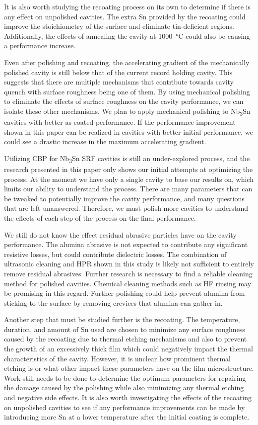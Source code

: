 \documentclass[reprint,amsmath,amssymb,aps]{revtex4-2}%
\begin{document}
It is also worth studying the recoating process on its own to determine if there is any effect on unpolished cavities. The extra Sn provided by the recoating could improve the stoichiometry of the surface and eliminate tin-deficient regions. Additionally, the effects of annealing the cavity at 1000~\unit{\celsius} could also be causing a performance increase.

Even after polishing and recoating, the accelerating gradient of the mechanically polished cavity is still below that of the current record holding cavity\cite{posen2021advances}. This suggests that there are multiple mechanisms that contribute towards cavity quench with surface roughness being one of them. By using mechanical polishing to eliminate the effects of surface roughness on the cavity performance, we can isolate these other mechanisms. We plan to apply mechanical polishing to Nb\textsubscript{3}Sn cavities with better as-coated performance. If the performance improvement shown in this paper can be realized in cavities with better initial performance, we could see a drastic increase in the maximum accelerating gradient.

Utilizing CBP for Nb\textsubscript{3}Sn SRF cavities is still an under-explored process, and the research presented in this paper only shows our initial attempts at optimizing the process. At the moment we have only a single cavity to base our results on, which limits our ability to understand the process. There are many parameters that can be tweaked to potentially improve the cavity performance, and many questions that are left unanswered. Therefore, we must polish more cavities to understand the effects of each step of the process on the final performance.

We still do not know the effect residual abrasive particles have on the cavity performance. The alumina abrasive is not expected to contribute any significant resistive losses, but could contribute dielectric losses. The combination of ultrasonic cleaning and HPR shown in this study is likely not sufficient to entirely remove residual abrasives. Further research is necessary to find a reliable cleaning method for polished cavities. Chemical cleaning methods such as HF rinsing may be promising in this regard. Further polishing could help prevent alumina from sticking to the surface by removing crevices that alumina can gather in.

Another step that must be studied further is the recoating. The temperature, duration, and amount of Sn used are chosen to minimize any surface roughness caused by the recoating due to thermal etching mechanisms and also to prevent the growth of an excessively thick film which could negatively impact the thermal characteristics of the cavity. However, it is unclear how prominent thermal etching is or what other impact these parameters have on the film microstructure. Work still needs to be done to determine the optimum parameters for repairing the damage caused by the polishing while also minimizing any thermal etching and negative side effects. It is also worth investigating the effects of the recoating on unpolished cavities to see if any performance improvements can be made by introducing more Sn at a lower temperature after the initial coating is complete.
\end{document}

